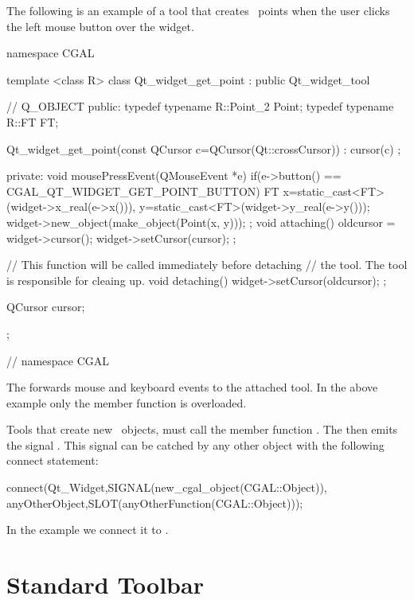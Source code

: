 The following is an example of a tool that creates \cgal\ points when the user 
clicks the left mouse button over the widget. 
 
\begin{ccExampleCode}
namespace CGAL {

template <class R>
class Qt_widget_get_point : public Qt_widget_tool
{
  //  Q_OBJECT
public:
  typedef typename R::Point_2	Point;
  typedef typename R::FT	FT;
  
  Qt_widget_get_point(const QCursor c=QCursor(Qt::crossCursor)) :
    cursor(c) {};
  
private:
  void mousePressEvent(QMouseEvent *e)
  {
    if(e->button() == CGAL_QT_WIDGET_GET_POINT_BUTTON)
    {
      FT
        x=static_cast<FT>(widget->x_real(e->x())),
        y=static_cast<FT>(widget->y_real(e->y()));
      widget->new_object(make_object(Point(x, y)));
    }
  };
  void attaching()
  {
    oldcursor = widget->cursor();
    widget->setCursor(cursor);
  };
  
  // This function will be called immediately before detaching
  // the tool. The tool is responsible for cleaing up.
  void detaching()
  {
    widget->setCursor(oldcursor);
  };

  QCursor cursor;
};

} // namespace CGAL
\end{ccExampleCode}

The  forwards mouse and keyboard events to the attached tool.
In the above example only the  member function is overloaded.

Tools that create new \cgal\ objects, must call the member 
function . The  
then emits the signal . This signal can be 
catched by any other object with the following connect statement:

\begin{ccExampleCode}
connect(Qt_Widget,SIGNAL(new_cgal_object(CGAL::Object)),
        anyOtherObject,SLOT(anyOtherFunction(CGAL::Object)));
\end{ccExampleCode}

In the example we connect it to .

\section{Standard Toolbar}
\label{Qt_widget_standard_toolbar}

